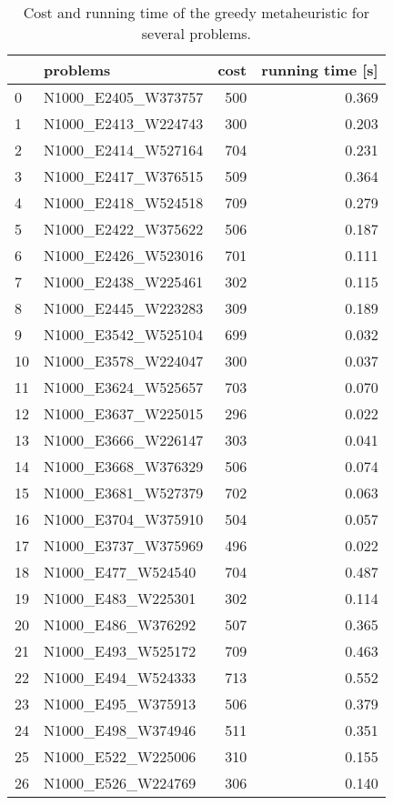 \begin{table}[H]
\centering
\begin{tabular}{llrr}
\toprule
{} &             problems &  cost &  running time [s] \\
\midrule
0  &  N1000\_E2405\_W373757 &   500 &             0.369 \\
1  &  N1000\_E2413\_W224743 &   300 &             0.203 \\
2  &  N1000\_E2414\_W527164 &   704 &             0.231 \\
3  &  N1000\_E2417\_W376515 &   509 &             0.364 \\
4  &  N1000\_E2418\_W524518 &   709 &             0.279 \\
5  &  N1000\_E2422\_W375622 &   506 &             0.187 \\
6  &  N1000\_E2426\_W523016 &   701 &             0.111 \\
7  &  N1000\_E2438\_W225461 &   302 &             0.115 \\
8  &  N1000\_E2445\_W223283 &   309 &             0.189 \\
9  &  N1000\_E3542\_W525104 &   699 &             0.032 \\
10 &  N1000\_E3578\_W224047 &   300 &             0.037 \\
11 &  N1000\_E3624\_W525657 &   703 &             0.070 \\
12 &  N1000\_E3637\_W225015 &   296 &             0.022 \\
13 &  N1000\_E3666\_W226147 &   303 &             0.041 \\
14 &  N1000\_E3668\_W376329 &   506 &             0.074 \\
15 &  N1000\_E3681\_W527379 &   702 &             0.063 \\
16 &  N1000\_E3704\_W375910 &   504 &             0.057 \\
17 &  N1000\_E3737\_W375969 &   496 &             0.022 \\
18 &   N1000\_E477\_W524540 &   704 &             0.487 \\
19 &   N1000\_E483\_W225301 &   302 &             0.114 \\
20 &   N1000\_E486\_W376292 &   507 &             0.365 \\
21 &   N1000\_E493\_W525172 &   709 &             0.463 \\
22 &   N1000\_E494\_W524333 &   713 &             0.552 \\
23 &   N1000\_E495\_W375913 &   506 &             0.379 \\
24 &   N1000\_E498\_W374946 &   511 &             0.351 \\
25 &   N1000\_E522\_W225006 &   310 &             0.155 \\
26 &   N1000\_E526\_W224769 &   306 &             0.140 \\
\bottomrule
\end{tabular}
\caption{Cost and running time of the greedy metaheuristic for several problems.}
\label{table:greedy-large-results}
\end{table}


